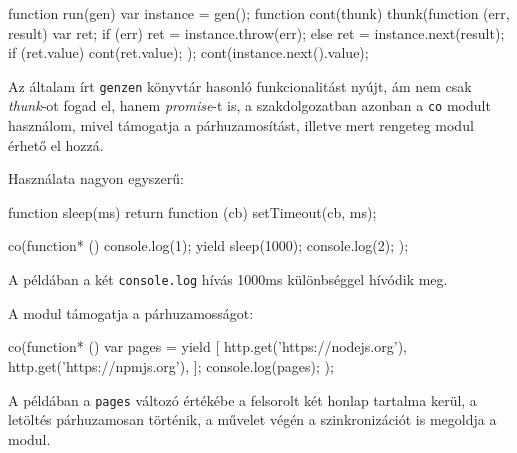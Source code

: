 \begin{js}
function run(gen) {
  var instance = gen();
  function cont(thunk) {
    thunk(function (err, result) {
      var ret;
      if (err) {
        ret = instance.throw(err);
      } else {
        ret = instance.next(result);
      }
      if (ret.value) {
        cont(ret.value);
      }
    });
  }
  cont(instance.next().value);
}
\end{js}

Az általam írt \verb=genzen= könyvtár hasonló funkcionalitást nyújt,
ám nem csak \emph{thunk}-ot fogad el, hanem \emph{promise}-t is,
a szakdolgozatban azonban a \verb=co= modult\cite{Co} használom,
mivel támogatja a párhuzamosítást, illetve mert rengeteg modul érhető el hozzá.

Használata nagyon egyszerű:

\begin{js}
function sleep(ms) {
  return function (cb) {
    setTimeout(cb, ms);
  }
}

co(function* () {
  console.log(1);
  yield sleep(1000);
  console.log(2);
});
\end{js}

A példában a két \verb=console.log= hívás 1000ms különbséggel hívódik meg.

A modul támogatja a párhuzamosságot:

\begin{js}
  co(function* () {
    var pages = yield [
      http.get('https://nodejs.org'),
      http.get('https://npmjs.org'),
    ];
    console.log(pages);
  });
\end{js}

A példában a \verb=pages= változó értékébe a felsorolt két honlap tartalma
kerül, a letöltés párhuzamosan történik, a művelet végén a szinkronizációt
is megoldja a modul.
